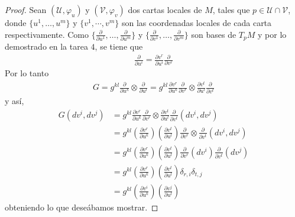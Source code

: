 \documentclass[10pt,a4paper]{report}
\begin{document}
\begin{proof}
	Sean $(\mathcal{U},\varphi_{u})$ y $(\mathcal{V},\varphi_{v})$ dos cartas locales de $M$, tales que $p \in \mathcal{U}\cap\mathcal{V}$, donde $\{u^{1},\dots,u^{m}\}$ y $\{v^{1},\cdots,v^{m}\}$ son las coordenadas locales de cada carta respectivamente.
	Como $\{\frac{\partial}{\partial u^{1}},\dots,\frac{\partial}{\partial u^{m}}\}$ y $\{\frac{\partial}{\partial v^{1}},\dots,\frac{\partial}{\partial v^{m}}\}$ son bases de $T_{p}M$ y por lo demostrado en la tarea $4$, se tiene que 
	\begin{align*}
		\frac{\partial}{\partial u^{i}} = \frac{\partial v^{r}}{\partial u^{i}}\frac{\partial}{\partial v^{r}}
	\end{align*}
   Por lo tanto
   \begin{align*}
   	G = g^{kl}\frac{\partial}{\partial u^{k}}\otimes\frac{\partial}{\partial u^{l}} = g^{kl}\frac{\partial v^{r}}{\partial u^{k}}\frac{\partial}{\partial v^{r}}\otimes \frac{\partial v^{t}}{\partial u^{l}}\frac{\partial}{\partial v^{t}}
   \end{align*}
   y así,
   \begin{align*}
   	G\left( dv^{i},dv^{j}\right) &= g^{kl}\frac{\partial v^{r}}{\partial u^{k}}\frac{\partial}{\partial v^{r}}\otimes \frac{\partial v^{t}}{\partial u^{l}}\frac{\partial}{\partial v^{t}}\left( dv^{i},dv^{j}\right)\\ &= g^{kl}\left( \frac{\partial v^{r}}{\partial u^{k}}\right) \left(\frac{\partial v^{t}}{\partial u^{l}} \right) \frac{\partial}{\partial v^{r}}\otimes \frac{\partial}{\partial v^{t}}\left( dv^{i},dv^{j}\right)\\ &= g^{kl}\left( \frac{\partial v^{r}}{\partial u^{k}}\right) \left(\frac{\partial v^{t}}{\partial u^{l}} \right) \frac{\partial}{\partial v^{r}}\left( dv^{i}\right) \frac{\partial}{\partial v^{t}}\left(dv^{j}\right)\\
   	&=  g^{kl}\left( \frac{\partial v^{r}}{\partial u^{k}}\right) \left(\frac{\partial v^{t}}{\partial u^{l}} \right) \delta_{r,i}\delta_{t,j}\\
   	&= g^{kl}\left( \frac{\partial v^{i}}{\partial u^{k}}\right) \left(\frac{\partial v^{j}}{\partial u^{l}} \right)
   \end{align*}
   obteniendo lo que deseábamos mostrar.
\end{proof}
\end{document}
